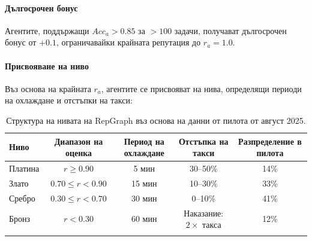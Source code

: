 \documentclass[11pt]{article}
\begin{document}
\paragraph{Дългосрочен бонус} Агентите, поддържащи $Acc_a > 0.85$ за $>100$ задачи, получават дългосрочен бонус от $+0.1$, ограничавайки крайната репутация до $r_a = 1.0$.

\paragraph{Присвояване на ниво} Въз основа на крайната $r_a$, агентите се присвояват на нива, определящи периоди на охлаждане и отстъпки на такси:
\begin{longtable}{@{}lcccc@{}}
\toprule
\textbf{Ниво} & \textbf{Диапазон на оценка} & \textbf{Период на охлаждане} & \textbf{Отстъпка на такси} & \textbf{Разпределение в пилота} \\\midrule
Платина & $r \geq 0.90$ & 5 мин & 30--50\% & 14\% \\
Злато & $0.70 \leq r < 0.90$ & 15 мин & 10--30\% & 33\% \\
Сребро & $0.30 \leq r < 0.70$ & 30 мин & 0--10\% & 41\% \\
Бронз & $r < 0.30$ & 60 мин & Наказание: $2 \times$ такса & 12\% \\\bottomrule
\caption{Структура на нивата на RepGraph въз основа на данни от пилота от август 2025.}
\label{tab:reputation-tiers}
\end{longtable}
\end{document}

